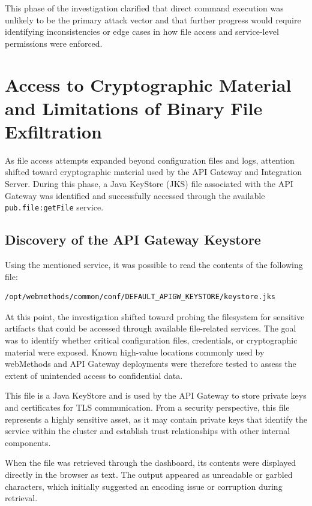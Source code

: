 \documentclass[12pt,a4paper]{report}
\begin{document}
This phase of the investigation clarified that direct command execution was unlikely to be the primary attack vector and that further progress would require identifying inconsistencies or edge cases in how file access and service-level permissions were enforced.
\clearpage
\section{Access to Cryptographic Material and Limitations of Binary File Exfiltration}

As file access attempts expanded beyond configuration files and logs, attention shifted toward cryptographic material used by the API Gateway and Integration Server. During this phase, a Java KeyStore (JKS) file associated with the API Gateway was identified and successfully accessed through the available \texttt{pub.file:getFile} service.

\subsection{Discovery of the API Gateway Keystore}

Using the mentioned service, it was possible to read the contents of the following file:

\begin{verbatim}
/opt/webmethods/common/conf/DEFAULT_APIGW_KEYSTORE/keystore.jks
\end{verbatim}
At this point, the investigation shifted toward probing the filesystem for sensitive artifacts that could be accessed through available file-related services. The goal was to identify whether critical configuration files, credentials, or cryptographic material were exposed. Known high-value locations commonly used by webMethods and API Gateway deployments were therefore tested to assess the extent of unintended access to confidential data.

This file is a Java KeyStore and is used by the API Gateway to store private keys and certificates for TLS communication. From a security perspective, this file represents a highly sensitive asset, as it may contain private keys that identify the service within the cluster and establish trust relationships with other internal components.

When the file was retrieved through the dashboard, its contents were displayed directly in the browser as text. The output appeared as unreadable or garbled characters, which initially suggested an encoding issue or corruption during retrieval.
\end{document}
